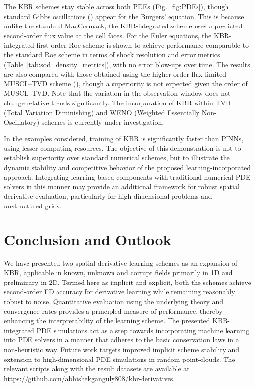 \documentclass{article} %
\theoremstyle{plain}
\begin{document}
The KBR schemes stay stable across both PDEs (Fig.~\ref{fig:PDEs}), though standard Gibbs oscillations (\cite{Wilbraham1848}) appear for the Burgers' equation. This is because unlike the standard MacCormack, the KBR-integrated scheme uses a predicted second-order flux value at the cell faces. For the Euler equations, the KBR-integrated first-order Roe scheme is shown to achieve performance comparable to the standard Roe scheme in terms of shock resolution and error metrics (Table~\ref{tab:sod_density_metrics}), with no error blow-ups over time. The results are also compared with those obtained using the higher-order flux-limited MUSCL–TVD scheme (\cite{laney1998computational}), though a superiority is not expected given the order of MUSCL–TVD. Note that the variation in the observation window does not change relative trends significantly. The incorporation of KBR within TVD (Total Variation Diminishing) and WENO (Weighted Essentially Non-Oscillatory) schemes is currently under investigation.

In the examples considered, training of KBR is significantly faster than PINNs, using lesser computing resources. The objective of this demonstration is not to establish superiority over standard numerical schemes, but to illustrate the dynamic stability and competitive behavior of the proposed learning-incorporated approach. Integrating learning-based components with traditional numerical PDE solvers in this manner may provide an additional framework for robust spatial derivative evaluation, particularly for high-dimensional problems and unstructured grids.


\section{Conclusion and Outlook}
We have presented two spatial derivative learning schemes as an expansion of KBR, applicable in known, unknown and corrupt fields primarily in 1D and preliminary in 2D. Termed here as implicit and explicit, both the schemes achieve second-order FD accuracy for derivative learning while remaining reasonably robust to noise. Quantitative evaluation using the underlying theory and convergence rates provides a principled measure of performance, thereby enhancing the interpretability of the learning scheme.
The presented KBR-integrated PDE simulations act as a step towards incorporating machine learning into PDE solvers in a manner that adheres to the basic conservation laws in a non-heuristic way.
Future work targets improved implicit scheme stability and extension to high-dimensional PDE simulations in random point-clouds. The relevant scripts along with the result datasets are available at 
\url{https://github.com/abhishekganguly808/kbr-derivatives}.
\end{document}
